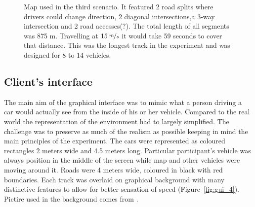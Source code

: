 \documentclass[11pt,english]{article}
\begin{document}
\begin{figure}[H] %
\caption{Map used in the third scenario. It featured 2 road splits where drivers could change direction, 2 diagonal intersections,a 3-way intersection and 2 road accesses(?). The total length of all segments was 875 m. Travelling at $15\:\nicefrac{m}{s}$ it would take 59 seconds to cover that distance. This was the longest track in the experiment and was designed for 8 to 14 vehicles.}
\label{fig:map_3_arrows}
\end{figure}



\subsection{Client's interface}

The main aim of the graphical interface was to mimic what a person driving a car would actually see from the inside of his or her vehicle. Compared to the real world the representation of the environment had to largely simplified. The challenge was to preserve as much of the realism as possible keeping in mind the main principles of the experiment. The cars were represented as coloured rectangles 2 meters wide and 4.5 meters long. Particular participant's vehicle was always position in the middle of the screen while map and other vehicles were moving around it. Roads were 4 meters wide, coloured in black with red boundaries. Each track was overlaid on graphical background with many distinctive features to allow for better sensation of speed (Figure~\ref{fig:gui_4}). Pictire used in the background comes from \citet{sheerwood}.
\end{document}
